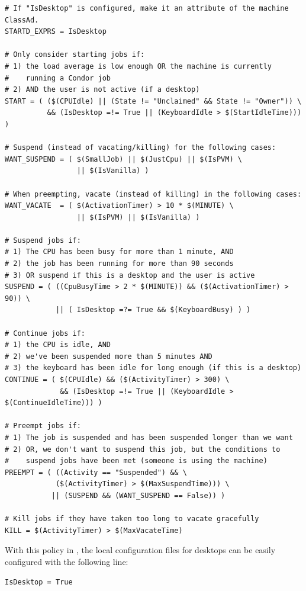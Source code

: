 \begin{verbatim}
# If "IsDesktop" is configured, make it an attribute of the machine ClassAd.
STARTD_EXPRS = IsDesktop

# Only consider starting jobs if:
# 1) the load average is low enough OR the machine is currently
#    running a Condor job
# 2) AND the user is not active (if a desktop)
START = ( ($(CPUIdle) || (State != "Unclaimed" && State != "Owner")) \
          && (IsDesktop =!= True || (KeyboardIdle > $(StartIdleTime))) )

# Suspend (instead of vacating/killing) for the following cases:
WANT_SUSPEND = ( $(SmallJob) || $(JustCpu) || $(IsPVM) \
                 || $(IsVanilla) )

# When preempting, vacate (instead of killing) in the following cases:
WANT_VACATE  = ( $(ActivationTimer) > 10 * $(MINUTE) \
                 || $(IsPVM) || $(IsVanilla) )

# Suspend jobs if:
# 1) The CPU has been busy for more than 1 minute, AND
# 2) the job has been running for more than 90 seconds
# 3) OR suspend if this is a desktop and the user is active
SUSPEND = ( ((CpuBusyTime > 2 * $(MINUTE)) && ($(ActivationTimer) > 90)) \
            || ( IsDesktop =?= True && $(KeyboardBusy) ) )

# Continue jobs if:
# 1) the CPU is idle, AND 
# 2) we've been suspended more than 5 minutes AND
# 3) the keyboard has been idle for long enough (if this is a desktop)
CONTINUE = ( $(CPUIdle) && ($(ActivityTimer) > 300) \
             && (IsDesktop =!= True || (KeyboardIdle > $(ContinueIdleTime))) )

# Preempt jobs if:
# 1) The job is suspended and has been suspended longer than we want
# 2) OR, we don't want to suspend this job, but the conditions to
#    suspend jobs have been met (someone is using the machine)
PREEMPT = ( ((Activity == "Suspended") && \
            ($(ActivityTimer) > $(MaxSuspendTime))) \
           || (SUSPEND && (WANT_SUSPEND == False)) )

# Kill jobs if they have taken too long to vacate gracefully
KILL = $(ActivityTimer) > $(MaxVacateTime) 

\end{verbatim}

With this policy in \condor{config}, the local configuration files for
desktops can be easily configured with the following line:

\begin{verbatim}
IsDesktop = True
\end{verbatim}

